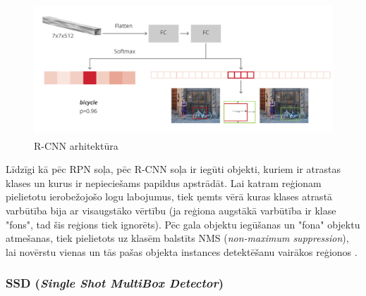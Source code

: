 \begin{figure}[h]%
	\centering
	\includegraphics[height=5cm]{images/rcnnarch.png} %
	\caption{R-CNN arhitektūra \cite{fasterrcnn}}%
	\label{fig:example}%
\end{figure}

Līdzīgi kā pēc RPN soļa, pēc R-CNN soļa ir iegūti objekti, kuriem ir atrastas klases un kurus ir nepieciešams papildus apstrādāt. Lai  katram reģionam pielietotu ierobežojošo logu labojumus, tiek ņemts vērā kuras klases atrastā varbūtība bija ar visaugstāko vērtību (ja reģiona augstākā varbūtība ir klase "fons", tad šis reģions tiek ignorēts). Pēc gala objektu iegūšanas un "fona" objektu atmešanas, tiek pielietots uz klasēm balstīts NMS (\textit{non-maximum suppression}), lai novērstu vienas un tās pašas objekta instances detektēšanu vairākos reģionos \cite{hosang2017learning}.

\subsubsection{SSD (\textit{Single Shot MultiBox Detector})}

